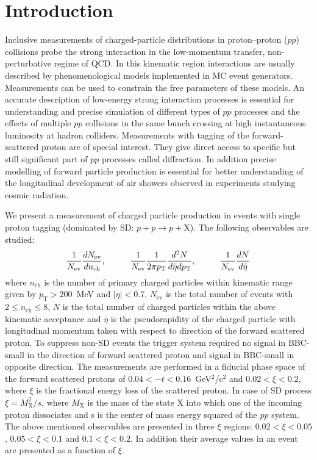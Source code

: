 \chapter{Introduction}\label{chapter:introduction}
Inclusive measurements of charged-particle distributions in proton–proton ($pp$) collisions probe the strong interaction in the low-momentum transfer, non-perturbative regime of \ac{QCD}. In this kinematic region interactions are usually described by phenomenological models implemented in \ac{MC} event generators. Measurements can be used to constrain the free parameters of these models. An accurate description of low-energy strong interaction processes is essential for understanding and precise simulation of different types of $pp$ processes and the effects of multiple $pp$ collisions in the same bunch crossing at high instantaneous luminosity at hadron colliders. Measurements with tagging of the forward-scattered proton are of special interest. They give direct access to specific but still significant part of $pp$ processes called diffraction. In addition precise modelling of forward particle production is essential for better understanding of the longitudinal development of air showers observed in experiments studying cosmic radiation.

We present a measurement of charged particle production in events with single proton tagging (dominated by SD: $p+p\to p+\textrm{X}$). The following observables are studied:
\begin{equation}
\frac{1}{N_\textrm{ev}}\frac{dN_\textrm{ev}}{dn_\textrm{ch}},\textrm{\hspace{1cm}} 
\frac{1}{N_\textrm{ev}}\frac{1}{2\pi p_\textrm{T}}\frac{d^2N}{d\bar{\eta}dp_\textrm{T}},\textrm{\hspace{1cm}} 
\frac{1}{N_\textrm{ev}}\frac{dN}{d\bar{\eta}}
\end{equation}
where $n_\textrm{ch}$ is the number of primary charged particles within kinematic range given by $p_\textrm{T}>200$~MeV and $|\eta|<0.7$, $N_\textrm{ev}$ is the 
total number of events with $2\leq n_\textrm{ch}\leq8$, $N$ is the total number of charged particles within the above kinematic acceptance and $\bar{\eta}$ is the pseudorapidity of the charged particle with longitudinal momentum taken with respect to direction of the forward scattered proton. To suppress non-SD events the trigger system required no signal in BBC-small in the direction of forward scattered proton and signal in BBC-small in opposite direction. The 
measurements are performed in a fiducial phase space of the forward scattered protons of $0.04<-t<0.16$~GeV$^2$/c$^2$ and 
$0.02<\xi<0.2$, where $\xi$ is the fractional energy loss of the scattered proton. In case of SD process $\xi=M^2_\textrm{X}/s$, where $M_\textrm{X}$ is 
the mass of the state $\textrm{X}$ into which one of the incoming proton dissociates and s is the center of mass energy squared of the $pp$ system. The above mentioned observables are presented in three $\xi$ 
regions: $0.02<\xi<0.05$, $0.05<\xi<0.1$ and $0.1<\xi<0.2$. In addition their average values in an event are presented as a function of $\xi$.

